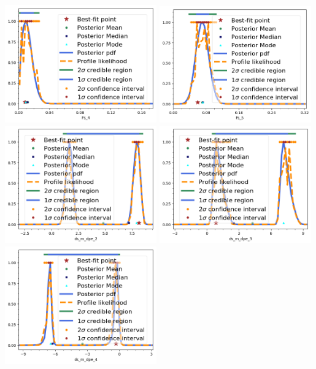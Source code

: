 \begin{center}
\includegraphics[width=0.49\textwidth]{figs/Fs_4.png}
\includegraphics[width=0.49\textwidth]{figs/Fs_5.png}\\
\includegraphics[width=0.49\textwidth]{figs/ds_m_dpe_2.png}
\includegraphics[width=0.49\textwidth]{figs/ds_m_dpe_3.png}\\
\includegraphics[width=0.49\textwidth]{figs/ds_m_dpe_4.png}

\end{center}
